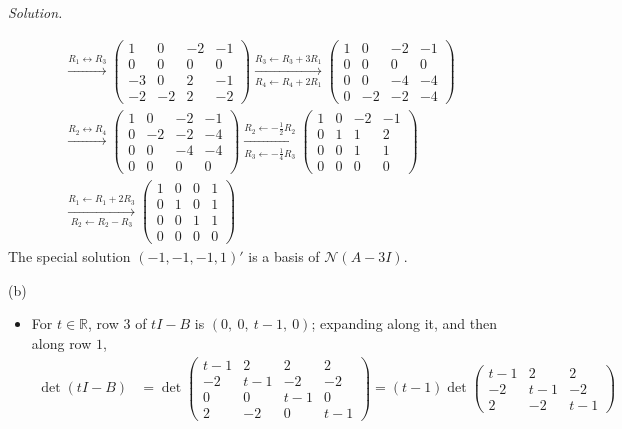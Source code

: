 \documentclass[12pt]{article}
\newcommand{\R}{\mathbb R}
\theoremstyle{definition}
\newenvironment{solution}{\par\noindent\textit{Solution.}\ }{\par\smallskip}
\begin{document}
\begin{solution}
\begin{itemize}
\[\begin{gathered}
\xrightarrow{R_1\leftrightarrow R_3}
\begin{pmatrix}1&0&-2&-1\\0&0&0&0\\-3&0&2&-1\\-2&-2&2&-2\end{pmatrix}
\xrightarrow[R_4\leftarrow R_4+2R_1]{R_3\leftarrow R_3+3R_1}
\begin{pmatrix}1&0&-2&-1\\0&0&0&0\\0&0&-4&-4\\0&-2&-2&-4\end{pmatrix}
\\
\xrightarrow{R_2\leftrightarrow R_4}
\begin{pmatrix}1&0&-2&-1\\0&-2&-2&-4\\0&0&-4&-4\\0&0&0&0\end{pmatrix}
\xrightarrow[R_3\leftarrow-\frac14R_3]{R_2\leftarrow-\frac12R_2}
\begin{pmatrix}1&0&-2&-1\\0&1&1&2\\0&0&1&1\\0&0&0&0\end{pmatrix}
\\
\xrightarrow[R_2\leftarrow R_2-R_3]{R_1\leftarrow R_1+2R_3}
\begin{pmatrix}1&0&0&1\\0&1&0&1\\0&0&1&1\\0&0&0&0\end{pmatrix}
\end{gathered}
\]
The special solution \((-1,-1,-1,1)'\) is a basis of \(\mathcal N(A-3I)\).
\end{itemize}
(b)
\begin{itemize}
\item For \(t\in\R\), row \(3\) of \(tI-B\) is \((0,\ 0,\ t-1,\ 0)\); expanding along it, and then along row \(1\),
\[
\begin{aligned}
\det(tI-B)&=\det\begin{pmatrix}t-1&2&2&2\\-2&t-1&-2&-2\\0&0&t-1&0\\2&-2&0&t-1\end{pmatrix}
=(t-1)\det\begin{pmatrix}t-1&2&2\\-2&t-1&-2\\2&-2&t-1\end{pmatrix}\\

\end{aligned}\]
\end{itemize}
\end{solution}
\end{document}
